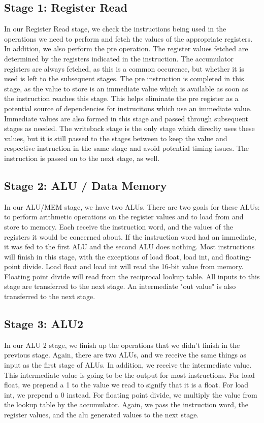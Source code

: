 \documentclass[sigconf]{acmart}
\begin{document}
\subsection{Stage 1: Register Read}
In our Register Read stage, we check the instructions being used in the operations we need to perform and fetch the values of the appropriate registers. In addition, we also perform the pre operation. The register values fetched are determined by the registers indicated in the instruction. The accumulator registers are always fetched, as this is a common occurence, but whether it is used is left to the subsequent stages. The pre instruction is completed in this stage, as the value to store is an immediate value which is available as soon as the instruction reaches this stage. This helps eliminate the pre register as a potential source of dependencies for instrucitons which use an immediate value. Immediate values are also formed in this stage and passed through subsequent stages as needed. The writeback stage is the only stage which direclty uses these values, but it is still passed to the stages between to keep the value and respective instruction in the same stage and avoid potential timing issues.  The instruction is passed on to the next stage, as well.

\subsection{Stage 2: ALU / Data Memory}
In our ALU/MEM stage, we have two ALUs. There are two goals for these ALUs: to perform arithmetic operations on the register values and to load from and store to memory. Each receive the instruction word, and the values of the registers it would be concerned about. If the instruction word had an immediate, it was fed to the first ALU and the second ALU does nothing. Most instructions will finish in this stage, with the exceptions of load float, load int, and floating-point divide. Load float and load int will read the 16-bit value from memory. Floating point divide will read from the reciprocal lookup table. All inputs to this stage are transferred to the next stage. An intermediate "out value" is also transferred to the next stage.

\subsection{Stage 3: ALU2}
In our ALU 2 stage, we finish up the operations that we didn’t finish in the previous stage. Again, there are two ALUs, and we receive the same things as input as the first stage of ALUs. In addition, we receive the intermediate value. This intermediate value is going to be the output for most instructions. For load float, we prepend a 1 to the value we read to signify that it is a float. For load int, we prepend a 0 instead. For floating point divide, we multiply the value from the lookup table by the accumulator. Again, we pass the instruction word, the register values, and the alu generated values to the next stage.
\end{document}
